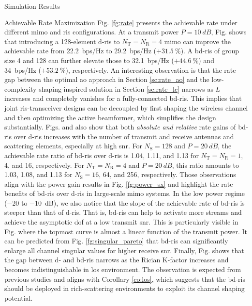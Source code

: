 \documentclass[journal]{IEEEtran}
\begin{document}
\begin{section}{Simulation Results}
\begin{subsection}{Achievable Rate Maximization}
		Fig. \ref{fg:rate} presents the achievable rate under different \gls{mimo} and \gls{ris} configurations.
		At a transmit power $P = \qty{10}{dB}$, Fig.  shows that introducing a 128-element \gls{d}-\gls{ris} to $N_\mathrm{T}=N_\mathrm{R}=4$ \gls{mimo} can improve the achievable rate from \qty{22.2}{bps/Hz} to \qty{29.2}{bps/Hz} ($+\qty{31.5}{\percent}$).
		A \gls{bd}-\gls{ris} of group size 4 and 128 can further elevate those to \qty{32.1}{bps/Hz} ($+\qty{44.6}{\percent}$) and \qty{34}{bps/Hz}  ($+\qty{53.2}{\percent}$), respectively.
		An interesting observation is that the rate gap between the optimal \gls{ao} approach in Section \ref{sc:rate_ao} and the low-complexity shaping-inspired solution in Section \ref{sc:rate_lc} narrows as $L$ increases and completely vanishes for a fully-connected \gls{bd}-\gls{ris}.
		This implies that joint \gls{ris}-transceiver designs can be decoupled by first shaping the wireless channel and then optimizing the active beamformer, which simplifies the design substantially.
		Figs.  and  also show that both \emph{absolute and relative} rate gains of \gls{bd}-\gls{ris} over \gls{d}-\gls{ris}
		increases with the number of transmit and receive antennas and scattering elements, especially at high \gls{snr}.
		For $N_\mathrm{S}=128$ and $P = \qty{20}{dB}$,
		the achievable rate ratio of \gls{bd}-\gls{ris} over \gls{d}-\gls{ris} is \num{1.04}, \num{1.11}, and \num{1.13} for $N_\mathrm{T}=N_\mathrm{R}=1$, \num{4}, and \num{16}, respectively.
		For $N_\mathrm{T}=N_\mathrm{R}=4$ and $P = \qty{20}{dB}$, this ratio amounts to \num{1.03}, \num{1.08}, and \num{1.13} for $N_\mathrm{S}=16$, \num{64}, and \num{256}, respectively.
		Those observations align with the power gain results in Fig. \ref{fg:power_sx} and highlight the rate benefits of \gls{bd}-\gls{ris} over \gls{d}-\gls{ris} in large-scale \gls{mimo} systems.
		In the low power regime (\num{-20} to \qty{-10}{dB}), we also notice that the slope of the achievable rate of \gls{bd}-\gls{ris} is steeper than that of \gls{d}-\gls{ris}.
		That is, \gls{bd}-\gls{ris} can help to activate more streams and achieve the asymptotic \gls{dof} at a low transmit \gls{snr}.
		This is particularly visible in Fig.  where the topmost curve is almost a linear function of the transmit power.
		It can be predicted from Fig. \ref{fg:singular_pareto} that \gls{bd}-\gls{ris} can significantly enlarge all channel singular values for higher receive \gls{snr}.
		Finally, Fig.  shows that the gap between \gls{d}- and \gls{bd}-\gls{ris} narrows as the Rician K-factor increases and becomes indistinguishable in \gls{los} environment.
		The observation is expected from previous studies \cite{Shen2020a,Li2023b,Nerini2023} and aligns with Corollary \ref{co:los}, which suggests that the \gls{bd}-\gls{ris} should be deployed in rich-scattering environments to exploit its channel shaping potential.


\end{subsection}
\end{section}
\end{document}
